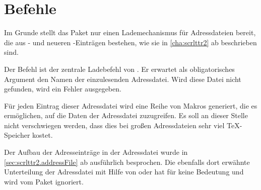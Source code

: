 \section{Befehle}

Im Grunde stellt das Paket nur einen Lademechanismus für Adressdateien bereit,
die aus - und neueren
-Einträgen bestehen, wie sie in
\autoref{cha:scrlttr2} ab  beschrieben
sind.


\begin{Declaration}
\end{Declaration}%
Der Befehl  ist der zentrale Ladebefehl
von .
Er erwartet als obligatorisches Argument den
Namen der einzulesenden Adressdatei.
Wird diese Datei nicht gefunden, wird ein Fehler ausgegeben.

Für jeden Eintrag dieser Adressdatei wird eine Reihe von Makros generiert,
die es ermöglichen, auf die Daten der Adressdatei zuzugreifen. Es soll an
dieser Stelle nicht verschwiegen werden, dass dies bei großen Adressdateien
sehr viel \TeX-Speicher kostet.
%
\EndIndexGroup

\begin{Declaration}%
\end{Declaration}%
Der Aufbau der Adresseinträge in der Adressdatei wurde in
\autoref{sec:scrlttr2.addressFile} ab
 ausführlich besprochen. Die
ebenfalls dort erwähnte Unterteilung der Adressdatei mit Hilfe von
 oder  hat für  keine
Bedeutung und wird vom Paket ignoriert.%
\EndIndexGroup


